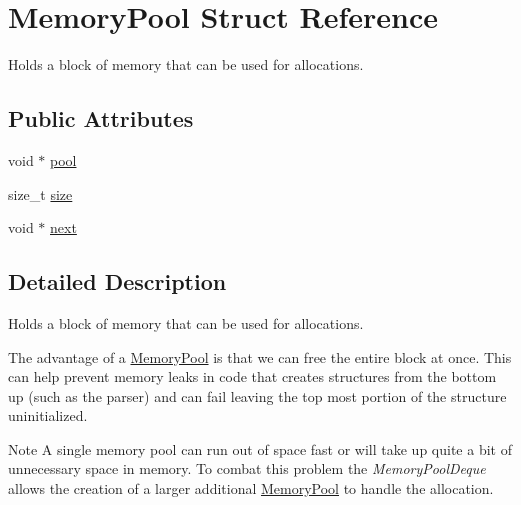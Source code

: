 \hypertarget{structMemoryPool}{\section{Memory\-Pool Struct Reference}
\label{structMemoryPool}
}


Holds a block of memory that can be used for allocations.  


\subsection*{Public Attributes}
\begin{DoxyCompactItemize}
\item 
void $\ast$ \hyperlink{structMemoryPool_aac9222b12332558fb831f4b9b4400763}{pool}
\item 
size\-\_\-t \hyperlink{structMemoryPool_af554fe1d65607ebfd49e195db299b827}{size}
\item 
void $\ast$ \hyperlink{structMemoryPool_af5fd87a1dc44d4e5ea496d403c426d92}{next}
\end{DoxyCompactItemize}


\subsection{Detailed Description}
Holds a block of memory that can be used for allocations. 

The advantage of a \hyperlink{structMemoryPool}{Memory\-Pool} is that we can free the entire block at once. This can help prevent memory leaks in code that creates structures from the bottom up (such as the parser) and can fail leaving the top most portion of the structure uninitialized.

\begin{DoxyNote}{Note}
A single memory pool can run out of space fast or will take up quite a bit of unnecessary space in memory. To combat this problem the {\itshape Memory\-Pool\-Deque} allows the creation of a larger additional \hyperlink{structMemoryPool}{Memory\-Pool} to handle the allocation. 
\end{DoxyNote}


